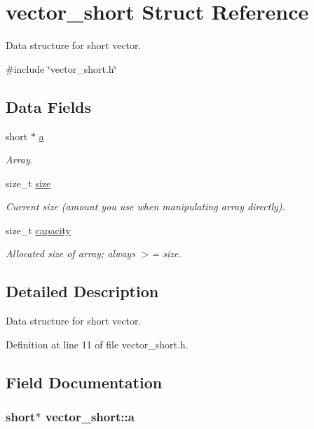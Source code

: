 \hypertarget{structvector__short}{\section{vector\-\_\-short \-Struct \-Reference}
\label{structvector__short}
}


\-Data structure for short vector.  




{\ttfamily \#include \char`\"{}vector\-\_\-short.\-h\char`\"{}}

\subsection*{\-Data \-Fields}
\begin{DoxyCompactItemize}
\item 
short $\ast$ \hyperlink{structvector__short_a00c0c3c687265f312f823516ba10f5ba}{a}
\begin{DoxyCompactList}\small\item\em \-Array. \end{DoxyCompactList}\item 
size\-\_\-t \hyperlink{structvector__short_a40844e43099756849900956e128123a3}{size}
\begin{DoxyCompactList}\small\item\em \-Current size (amount you use when manipulating array directly). \end{DoxyCompactList}\item 
size\-\_\-t \hyperlink{structvector__short_a06409947c0c59b65b52537c6bade6569}{capacity}
\begin{DoxyCompactList}\small\item\em \-Allocated size of array; always $>$= size. \end{DoxyCompactList}\end{DoxyCompactItemize}


\subsection{\-Detailed \-Description}
\-Data structure for short vector. 



\-Definition at line 11 of file vector\-\_\-short.\-h.



\subsection{\-Field \-Documentation}
\hypertarget{structvector__short_a00c0c3c687265f312f823516ba10f5ba}{
\subsubsection[{a}]{\setlength{\rightskip}{0pt plus 5cm}short$\ast$ {\bf vector\-\_\-short\-::a}}}\label{structvector__short_a00c0c3c687265f312f823516ba10f5ba}


